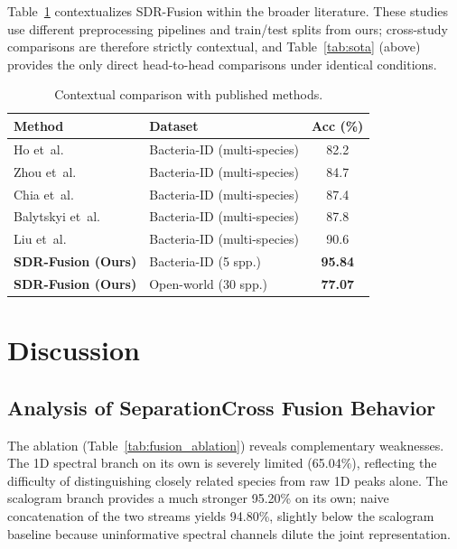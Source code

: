 \documentclass[preprint,12pt]{elsarticle}
\begin{document}
Table~\ref{tab:comparison} contextualizes SDR-Fusion within the broader
literature. These studies use different preprocessing pipelines and
train/test splits from ours; cross-study comparisons are therefore
strictly contextual, and Table~\ref{tab:sota} (above) provides the
only direct head-to-head comparisons under identical conditions.


\begin{table}[!t]
\centering
\caption{Contextual comparison with published methods.}
\label{tab:comparison}
\small
\begin{tabularx}{\linewidth}{l X c}
  \toprule
  Method & Dataset & Acc (\%) \\
  \midrule
  Ho et~al.~\cite{ho2019rapid}
      & Bacteria-ID (multi-species) & 82.2 \\
  Zhou et~al.~\cite{zhou2022ramannet}
      & Bacteria-ID (multi-species) & 84.7 \\
  Chia et~al.~\cite{chia2021interpretable}
      & Bacteria-ID (multi-species) & 87.4 \\
  Balytskyi et~al.~\cite{balytskyi2024open}
      & Bacteria-ID (multi-species) & 87.8 \\
  Liu et~al.~\cite{liu2024wpga}
      & Bacteria-ID (multi-species) & 90.6 \\
  \midrule
  \textbf{SDR-Fusion (Ours)}
      & Bacteria-ID (5 spp.)        & \textbf{95.84} \\
  \textbf{SDR-Fusion (Ours)}
      & Open-world (30 spp.)        & \textbf{77.07} \\
  \bottomrule
\end{tabularx}
\end{table}

\section{Discussion}
\label{sec:discussion}

\subsection{Analysis of SeparationCross Fusion Behavior}
\label{ssec:why}

The ablation (Table~\ref{tab:fusion_ablation}) reveals complementary
weaknesses. The 1D spectral branch on its own is severely limited
(65.04\%), reflecting the difficulty of distinguishing closely related
species from raw 1D peaks alone. The scalogram branch provides a much
stronger 95.20\% on its own; naive concatenation of the two streams
yields 94.80\%, slightly below the scalogram baseline because
uninformative spectral channels dilute the joint representation.
\end{document}
